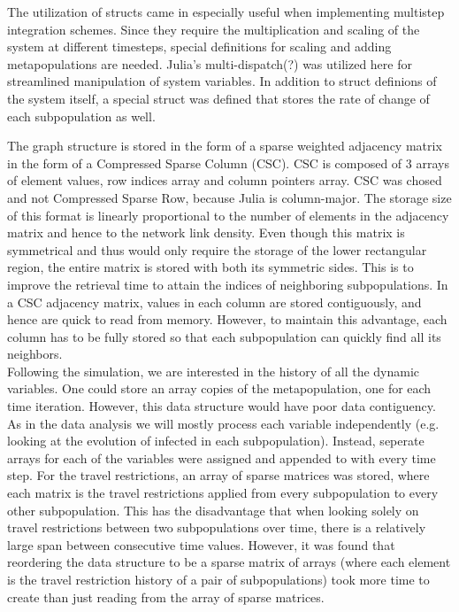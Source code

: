 The utilization of structs came in especially useful when implementing multistep integration schemes. Since they require the multiplication and scaling of the system at different timesteps, special definitions for scaling and adding metapopulations are needed. Julia's multi-dispatch(?) was utilized here for streamlined manipulation of system variables. In addition to struct definions of the system itself, a special struct was defined that stores the rate of change of each subpopulation as well.

The graph structure is stored in the form of a sparse weighted adjacency matrix in the form of a Compressed Sparse Column (CSC).  CSC is composed of 3 arrays of element values, row indices array and column pointers array. CSC was chosed and not Compressed Sparse Row, because Julia is column-major. The storage size of this format is linearly proportional to the number of elements in the adjacency matrix and hence to the network link density. Even though this matrix is symmetrical and thus would only require the storage of the lower rectangular region, the entire matrix is stored with both its symmetric sides. This is to improve the retrieval time to attain the indices of neighboring subpopulations. In a CSC adjacency matrix, values in each column are stored contiguously, and hence are quick to read from memory. However, to maintain this advantage, each column has to be fully stored so that each subpopulation can quickly find all its neighbors.\\

Following the simulation, we are interested in the history of all the dynamic variables. One could store an array copies of the metapopulation, one for each time iteration. However, this data structure would have poor data contiguency. As in the data analysis we will mostly process each variable independently (e.g. looking at the evolution of infected in each subpopulation). Instead, seperate arrays for each of the variables were assigned and appended to with every time step. For the travel restrictions, an array of sparse matrices was stored, where each matrix is the travel restrictions applied from every subpopulation to every other subpopulation. This has the disadvantage that when looking solely on travel restrictions between two subpopulations over time, there is a relatively large span between consecutive time values. However, it was found that reordering the data structure to be a sparse matrix of arrays (where each element is the travel restriction history of a pair of subpopulations) took more time to create than just reading from the array of sparse matrices.\\

